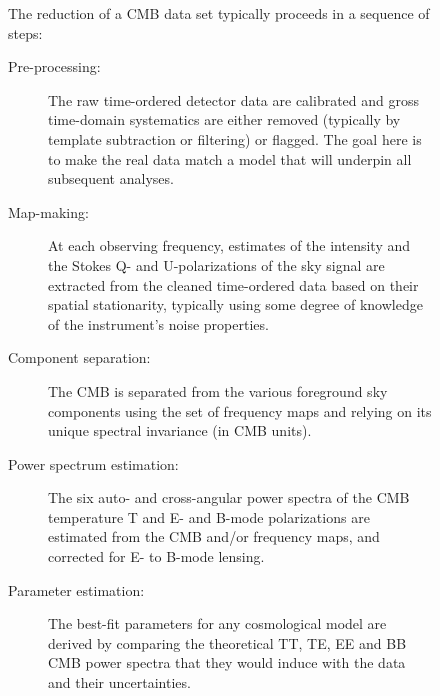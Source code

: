 \begin{figure}[htbp]
\begin{minipage}[h]{0.7\linewidth}
The reduction of a CMB data set typically proceeds in a sequence of steps:
\begin{description}
\item[ Pre-processing:] The raw time-ordered detector data are calibrated and gross time-domain systematics are either removed (typically by template subtraction or filtering) or flagged. The goal here is to make the real data match a model that will underpin all subsequent analyses.
\item[Map-making:] At each observing frequency, estimates of the intensity and the Stokes Q- and U-polarizations of the sky signal are extracted from the cleaned time-ordered data based on their spatial stationarity, typically using some degree of knowledge of the instrument's noise properties.
\item[Component separation:] The CMB is separated from the various foreground sky components using the set of frequency maps and relying on its unique spectral invariance (in CMB units).
\item[Power spectrum estimation:] The six auto- and cross-angular power spectra of the CMB temperature T and E- and B-mode polarizations are estimated from the CMB and/or frequency maps, and corrected for E- to B-mode lensing.
\item[Parameter estimation:] The best-fit parameters for any cosmological model are derived by comparing the theoretical TT, TE, EE and BB CMB power spectra that they would induce with the data and their uncertainties.
\end{description}
\end{minipage}
\begin{minipage}[h]{0.275\linewidth}
\centering

\end{minipage}
\end{figure}
